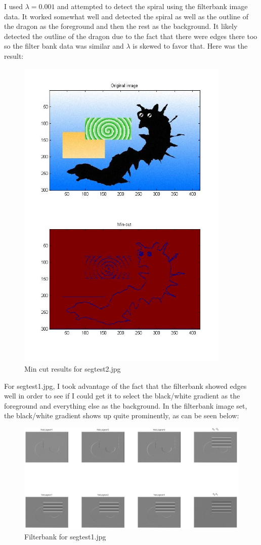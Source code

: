 \documentclass[11pt,psfig]{article}
\begin{document}
I used $\lambda=0.001$ and attempted to detect the spiral using the filterbank image data. It worked somewhat well and detected the spiral as well as the outline of the dragon as the foreground and then the rest as the background. It likely detected the outline of the dragon due to the fact that there were edges there too so the filter bank data was similar and $\lambda$ is skewed to favor that. Here was the result:

\begin{figure}[H]
\centering
\includegraphics[width=4in]{prob5plotB_1.jpg}
\caption{Min cut results for segtest2.jpg}
\end{figure}

For segtest1.jpg, I took advantage of the fact that the filterbank showed edges well in order to see if I could get it to select the black/white gradient as the foreground and everything else as the background. In the filterbank image set, the black/white gradient shows up quite prominently, as can be seen below:

\begin{figure}[H]
\centering
\includegraphics[width=6in]{prob5plotB_2_filter.jpg}
\caption{Filterbank for segtest1.jpg}
\end{figure}
\end{document}
